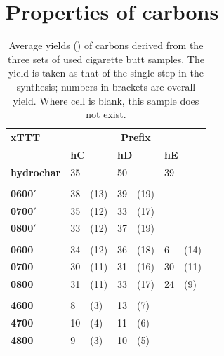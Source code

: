 \newpage


\section{Properties of carbons}
\label{s:cb_results}

\begin{table}[b!]
    \caption{Average yields (\unit{\wtpercent}) of carbons derived from the three sets of used cigarette butt samples. The yield is taken as that of the single step in the synthesis; numbers in brackets are overall yield. Where cell is blank, this sample does not exist.}
    \label{tb:cb_yield}
    \begin{tabularx}{\textwidth}{llXlXlX}
        \toprule
            \textbf{xTTT} & \multicolumn{6}{c}{\textbf{Prefix}} \\
            & \multicolumn{2}{l}{\textbf{hC}} & \multicolumn{2}{l}{\textbf{hD}} & \multicolumn{2}{l}{\textbf{hE}} \\ 
        \midrule
            \textbf{hydrochar}  & 35 & & 50 & & 39 & \\
        \\
            \textbf{0600$'$} & 38 & (13) & 39 & (19) & & \\
            \textbf{0700$'$} & 35 & (12) & 33 & (17) & & \\
            \textbf{0800$'$} & 33 & (12) & 37 & (19) & & \\
        \\
            \textbf{0600} & 34 & (12) & 36 & (18) & 6 & (14) \\
            \textbf{0700} & 30 & (11) & 31 & (16) & 30 & (11)\\
            \textbf{0800} & 31 & (11) & 33 & (17) & 24 & (9)\\
        \\
            \textbf{4600} & 8 & (3) & 13 & (7) & & \\
            \textbf{4700} & 10 & (4) & 11 & (6) & & \\
            \textbf{4800} & 9 & (3) & 10 & (5) & & \\
        \bottomrule
    \end{tabularx}%
\end{table}

